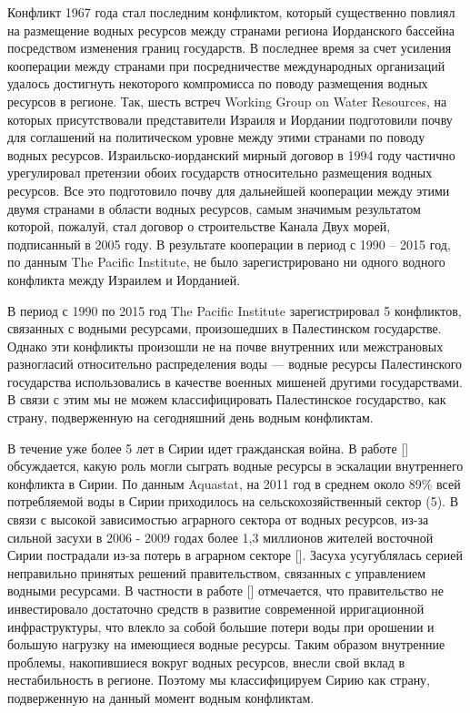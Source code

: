 \documentclass[a4paper, 12pt]{article}
\theoremstyle{plain} %
\theoremstyle{definition} %
\theoremstyle{remark} %
\begin{document}
Конфликт 1967 года стал последним конфликтом, который существенно повлиял на размещение водных ресурсов между странами региона Иорданского бассейна посредством изменения границ государств. В последнее время за счет усиления кооперации между странами при посредничестве международных организаций удалось достигнуть некоторого компромисса по поводу размещения водных ресурсов в регионе. Так, шесть встреч Working Group on Water Resources, на которых присутствовали представители Израиля и Иордании подготовили почву для соглашений на политическом уровне между этими странами по поводу водных ресурсов. Израильско-иорданский мирный договор в 1994 году частично урегулировал претензии обоих государств относительно размещения водных ресурсов. Все это подготовило почву для дальнейшей кооперации между этими двумя странами в области водных ресурсов, самым значимым результатом которой, пожалуй, стал договор о строительстве Канала Двух морей, подписанный в 2005 году. В результате кооперации в период с 1990 – 2015 год, по данным The Pacific Institute, не было зарегистрировано ни одного водного конфликта между Израилем и Иорданией.

В период с 1990 по 2015 год The Pacific Institute зарегистрировал 5 конфликтов, связанных с водными ресурсами, произошедших в Палестинском государстве. Однако эти конфликты произошли не на почве внутренних или межстрановых разногласий относительно распределения воды --- водные ресурсы Палестинского государства использовались в качестве военных мишеней другими государствами. В связи с этим мы не можем классифицировать Палестинское государство, как страну, подверженную на сегодняшний день водным конфликтам.

В течение уже более 5 лет в Сирии идет гражданская война. В работе [\cite{gleick2014}] обсуждается, какую роль могли сыграть водные ресурсы в эскалации внутреннего конфликта в Сирии. По данным Aquastat, на 2011 год в среднем около 89\% всей потребляемой воды  в Сирии приходилось на сельскохозяйственный сектор (5). В связи с высокой зависимостью аграрного сектора от водных ресурсов, из-за сильной засухи в 2006 - 2009 годах более 1,3 миллионов жителей восточной Сирии пострадали из-за потерь в аграрном секторе [\cite{gleick2014}]. Засуха усугублялась серией неправильно принятых решений правительством, связанных с управлением водными ресурсами. В частности в работе [\cite{gleick2014}] отмечается, что правительство не инвестировало достаточно средств в развитие современной ирригационной инфраструктуры, что влекло за собой большие потери воды при орошении и большую нагрузку на имеющиеся водные ресурсы. Таким образом внутренние проблемы, накопившиеся вокруг водных ресурсов, внесли свой вклад в нестабильность в регионе. Поэтому мы классифицируем Сирию как страну, подверженную на данный момент водным конфликтам. 
\end{document}
